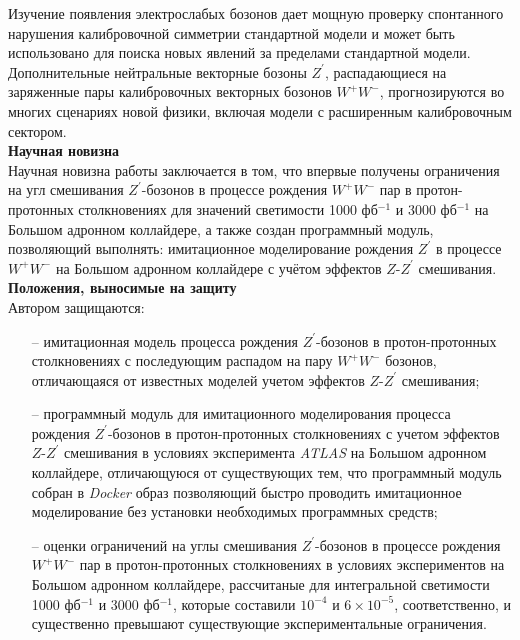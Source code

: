Изучение появления электрослабых бозонов дает мощную проверку спонтанного нарушения 
калибровочной симметрии стандартной модели и может быть использовано для поиска новых явлений за пределами стандартной модели. 
Дополнительные нейтральные векторные бозоны ${Z}^{\prime}$, распадающиеся на заряженные пары калибровочных векторных бозонов ${W}^{+}{W}^{-}$, 
прогнозируются во многих сценариях новой физики, включая модели с расширенным калибровочным сектором.
\\

\textbf{Научная новизна}\\

Научная новизна работы заключается в том, что впервые получены ограничения на угл смешивания ${Z}^{\prime}$-бозонов в
процессе рождения ${W}^{+}$${W}^{-}$ пар в протон-протонных столкновениях для значений светимости 1000 фб${}^{−1}$ и 3000 фб${}^{−1}$ на Большом адронном коллайдере, а также создан программный модуль, позволяющий выполнять: имитационное моделирование рождения ${Z}^{\prime}$ в процессе ${W}^{+}{W}^{-}$
на Большом адронном коллайдере с учётом эффектов $Z$-${Z}^{\prime}$ смешивания.
\\

\textbf{Положения, выносимые на защиту}\\

Автором защищаются:
\begin{enumerate}
	\item[--] имитационная модель процесса рождения ${Z}^{\prime}$-бозонов в протон-протонных столкновениях с последующим распадом на пару ${W}^{+}{W}^{-}$ бозонов, отличающаяся от известных моделей учетом эффектов $Z$-${Z}^{\prime}$ смешивания;
	
	\item[--] программный модуль для имитационного моделирования процесса
	рождения ${Z}^{\prime}$-бозонов в протон-протонных столкновениях с учетом эффектов $Z$-${Z}^{\prime}$ смешивания в условиях эксперимента \textit{ATLAS} на Большом адронном коллайдере, отличающуюся от существующих тем, что программный модуль собран в \textit{Docker} образ позволяющий быстро проводить имитационное моделирование без установки необходимых программных средств;
	
	\item[--] оценки ограничений на углы смешивания ${Z}^{\prime}$-бозонов в
	процессе рождения ${W}^{+}$${W}^{-}$ пар в протон-протонных столкновениях
	в условиях экспериментов на Большом адронном коллайдере, рассчитаные для интегральной светимости 1000 фб${}^{−1}$ и 3000 фб${}^{−1}$, которые составили  ${10}^{-4}$ и $6\times{10}^{-5}$, соответственно, и существенно превышают существующие экспериментальные ограничения.
	
\end{enumerate}
\vspace{2cm}

